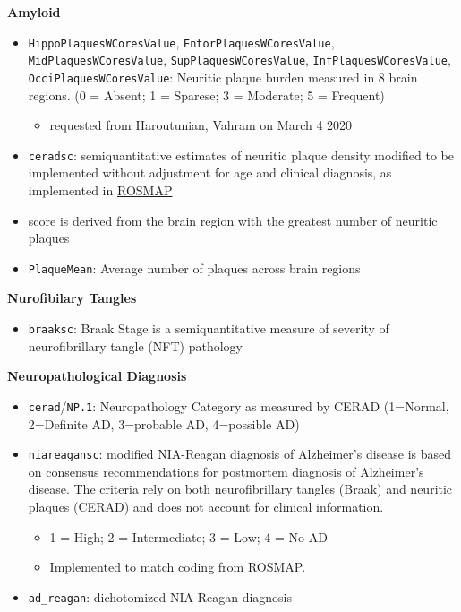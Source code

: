 \documentclass[]{book}
\providecommand{\tightlist}{%
  \setlength{\itemsep}{0pt}\setlength{\parskip}{0pt}}
\begin{document}
\textbf{Amyloid}

\begin{itemize}
\tightlist
\item
  \texttt{HippoPlaquesWCoresValue}, \texttt{EntorPlaquesWCoresValue}, \texttt{MidPlaquesWCoresValue}, \texttt{SupPlaquesWCoresValue}, \texttt{InfPlaquesWCoresValue}, \texttt{OcciPlaquesWCoresValue}: Neuritic plaque burden measured in 8 brain regions. (0 = Absent; 1 = Sparese; 3 = Moderate; 5 = Frequent)

  \begin{itemize}
  \tightlist
  \item
    requested from Haroutunian, Vahram on March 4 2020
  \end{itemize}
\item
  \texttt{ceradsc}: semiquantitative estimates of neuritic plaque density modified to be implemented without adjustment for age and clinical diagnosis, as implemented in \href{https://www.radc.rush.edu/docs/var/detail.htm?category=Pathology\&subcategory=Alzheimer\%27s+disease\&variable=ceradsc}{ROSMAP}
\item
  score is derived from the brain region with the greatest number of neuritic plaques
\item
  \texttt{PlaqueMean}: Average number of plaques across brain regions
\end{itemize}

\textbf{Nurofibilary Tangles}

\begin{itemize}
\tightlist
\item
  \texttt{braaksc}: Braak Stage is a semiquantitative measure of severity of neurofibrillary tangle (NFT) pathology
\end{itemize}

\textbf{Neuropathological Diagnosis}

\begin{itemize}
\tightlist
\item
  \texttt{cerad}/\texttt{NP.1}: Neuropathology Category as measured by CERAD (1=Normal, 2=Definite AD, 3=probable AD, 4=possible AD)
\item
  \texttt{niareagansc}: modified NIA-Reagan diagnosis of Alzheimer's disease is based on consensus recommendations for postmortem diagnosis of Alzheimer's disease. The criteria rely on both neurofibrillary tangles (Braak) and neuritic plaques (CERAD) and does not account for clinical information.

  \begin{itemize}
  \tightlist
  \item
    1 = High; 2 = Intermediate; 3 = Low; 4 = No AD
  \item
    Implemented to match coding from
    \href{https://www.radc.rush.edu/docs/var/detail.htm?category=Pathology\&subcategory=Alzheimer\%27s+disease\&variable=niareagansc}{ROSMAP}.\\
  \end{itemize}
\item
  \texttt{ad\_reagan}: dichotomized NIA-Reagan diagnosis
\end{itemize}
\end{document}
